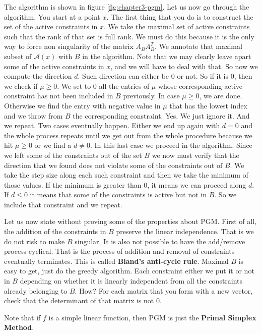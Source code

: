 \par The algorithm is shown in figure \ref{fig:chapter3-pgm}. Let us now go through the algorithm. You start at a point $x$. The first thing that you do is to construct the set of the active constraints in $x$. We take the maximal set of active constraints such that the rank of that set is full rank. We must do this because it is the only way to force non singularity of the matrix $A_B A_B^T$. We annotate that maximal subset of $\mathcal{A}(x)$ with $B$ in the algorithm. Note that we may clearly leave apart some of the active constraints in $x$, and we will have to deal with that. So now we compute the direction $d$. Such direction can either be 0 or not. So if it is 0, then we check if $\mu \geq 0$. We set to 0 all the entries of $\mu$ whose corresponding active constraint has not been included in $B$ previously. In case $\mu \geq 0$, we are done. Otherwise we find the entry with negative value in $\mu$ that has the lowest index and we throw from $B$ the corresponding constraint. Yes. We just ignore it. And we repeat. Two cases eventually happen. Either we end up again with $d = 0$ and the whole process repeats until we get out from the whole procedure because we hit $\mu \geq 0$ or we find a $d \neq 0$. In this last case we proceed in the algorithm. Since we left some of the constraints out of the set $B$ we now must verify that the direction that we found does not violate some of the constraints out of $B$. We take the step size along each such constraint and then we take the minimum of those values. If the minimum is greater than 0, it means we can proceed along $d$. If $d \leq 0$ it means that some of the constraints is active but not in $B$. So we include that constraint and we repeat.
\par Let us now state without proving some of the properties about PGM. First of all, the addition of the constraints in $B$ preserve the linear independence. That is we do not risk to make $B$ singular. It is also not possible to have the add/remove process cyclical. That is the process of addition and removal of constraints eventually terminates. This is called \textbf{Bland's anti-cycle rule}. Maximal $B$ is easy to get, just do the greedy algorithm. Each constraint either we put it or not in $B$ depending on whether it is linearly independent from all the constraints already belonging to $B$. How? For each matrix that you form with a new vector, check that the determinant of that matrix is not 0.
\par Note that if $f$ is a simple linear function, then PGM is just the \textbf{Primal Simplex Method}.
